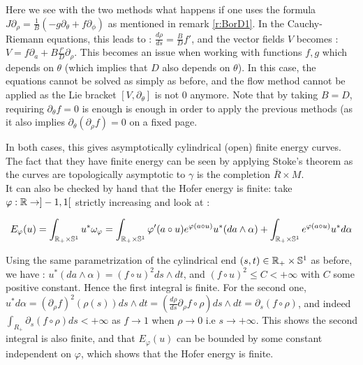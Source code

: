 \documentclass[../main.tex]{subfiles}
\begin{document}
\begin{remark}\label{r:theta_dependancy}
Here we see with the two methods what happens if one uses the formula $J\partial_\rho = \frac{1}{B}(-g\partial_\theta + f\partial_\phi)$ as mentioned in remark \ref{r:BorD1}. In the Cauchy-Riemann equations, this leads to : $\frac{d\rho}{ds} = \frac{B}{D} f'$, and the vector fields $V$ becomes : $V = f\partial_a + B\frac{f'}{D}\partial_\rho$. This becomes an issue when working with functions $f,g$ which depends on $\theta$ (which implies that $D$ also depends on $\theta$). In this case, the equations cannot be solved as simply as before, and the flow method cannot be applied as the Lie bracket $[V,\partial_\theta]$ is not $0$ anymore. Note that by taking $B = D$, requiring $\partial_\theta f = 0$ is enough is enough in order to apply the previous methods (as it also implies $\partial_\theta (\partial_\rho f) = 0$ on a fixed page.
\end{remark}

\begin{remark}
In both cases, this gives asymptotically cylindrical (open) finite energy curves. The fact that they have finite energy can be seen by applying Stoke's theorem as the curves are topologically asymptotic to $\gamma$ is the completion $\overline{R}\times M$.\\
It can also be checked by hand that the Hofer energy is finite: 
take $\varphi : \mathbb{R}\rightarrow ]-1,1[$ strictly increasing and look at :

$$E_\varphi(u) = \int_{\mathbb{R}_+\times \mathbb{S}^1}{u^*\omega_\varphi} = \int_{\mathbb{R}_+\times \mathbb{S}^1}{\varphi'(a\circ u)e^{\varphi(a\circ u)}u^*(da\wedge \alpha)} + \int_{\mathbb{R}_+\times \mathbb{S}^1}{e^{\varphi(a\circ u)}u^*d\alpha}$$

Using the same parametrization of the cylindrical end $(s,t)\in\mathbb{R}_+\times \mathbb{S}^1$ as before, we have : $u^*(da\wedge \alpha) = (f\circ u)^2 ds \wedge dt$, and $(f\circ u)^2\leq C < +\infty$ with $C$ some positive constant. Hence the first integral is finite. For the second one, $u^*d\alpha = (\partial_\rho f)^2(\rho(s))ds\wedge dt = (\frac{d\rho}{ds}\partial_\rho f\circ \rho)ds\wedge dt = \partial_s(f\circ \rho)$, and indeed $\displaystyle\int_{R_+}\partial_s(f\circ\rho)ds < + \infty$ as $f\rightarrow 1$ when $\rho \rightarrow 0$ i.e $s\rightarrow +\infty$. This shows the second integral is also finite, and that $E_\varphi(u)$ can be bounded by some constant independent on $\varphi$, which shows that the Hofer energy is finite.
\end{remark}
\end{document}
